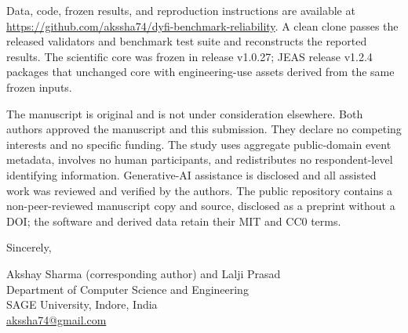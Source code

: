 \documentclass[10pt]{article}
\begin{document}
Data, code, frozen results, and reproduction instructions are available at
\url{https://github.com/akssha74/dyfi-benchmark-reliability}. A clean clone
passes the released validators and benchmark test suite and reconstructs the
reported results. The scientific core was frozen in release v1.0.27; JEAS
release v1.2.4 packages that unchanged core with engineering-use assets derived
from the same frozen inputs.

The manuscript is original and is not under consideration elsewhere. Both
authors approved the manuscript and this submission. They declare no competing
interests and no specific funding. The study uses aggregate public-domain event
metadata, involves no human participants, and redistributes no respondent-level
identifying information. Generative-AI assistance is disclosed and all assisted
work was reviewed and verified by the authors. The public repository contains a
non-peer-reviewed manuscript copy and source, disclosed as a preprint without a
DOI; the software and derived data retain their MIT and CC0 terms.

\medskip
Sincerely,

Akshay Sharma (corresponding author) and Lalji Prasad\\
Department of Computer Science and Engineering\\
SAGE University, Indore, India\\
\href{mailto:akssha74@gmail.com}{akssha74@gmail.com}
\end{document}
